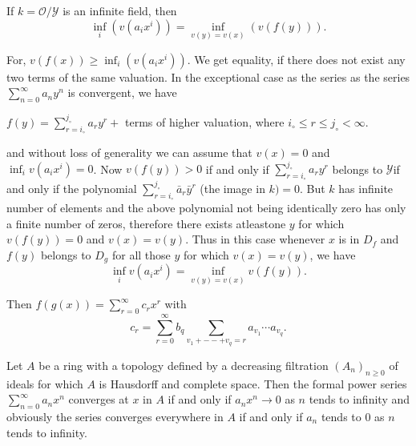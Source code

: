 \setcounter{remark}{0}
\begin{remark}
If $k=\mathscr{O}/ \mathscr{Y}$ is an infinite field, then
$$
\inf_i (v(a_i x^i))= \inf_{v(y) = v(x)} (v(f(y))).
$$
\end{remark}

For, $v(f(x))\geq \inf_i (v(a_i x^i))$. We get equality, if there does
not exist any two terms of the same valuation. In the exceptional case
as the series as the series $\sum\limits_{n=0}^{\infty} a_n y^n$ is
convergent, we have 

$f(y) = \sum\limits_{r=i_\circ}^{j_\circ}a_r y^r+$ terms of higher valuation,
where $i_\circ \leq r \leq j_\circ < \infty$.

and without loss of generality we can assume that $v(x)=0$ and $\inf_i
v(a_i x^i)=0$. Now $v(f(y))>0$ if and only if
$\sum\limits_{r=i_\circ}^{j_\circ} a_r y^r$ belongs to
$\mathscr{Y}$\iec  if and only if the polynomial
$\sum\limits_{r=i_\circ}^{j_\circ} \bar{a}_r \bar{y}^r$ (the image in
$k)=0$. But $k$ has infinite  number of elements and the above
polynomial not being identically zero has only a finite number of
zeros, therefore there exists  
atleast\pageoriginale one $y$ for which $v(f(y))=0$ and  $v(x) = v(y)$. Thus in this
case whenever $x$ is in $D_f$ and $f(y)$ belongs to $D_g$ for all
those $y$ for which $v(x) = v(y)$, we have 
$$
\inf_i v(a_i x^i)= \inf_{v(y) = v(x)} v(f(y)).
$$

Then $f(g(x)) = \sum\limits_{r=0}^{\infty} c_r x^r$ with
$$
c_r = \sum_{r=0}^{\infty} b_q \sum_{v_1 + --+v_q=r} a_{v_1}\cdots a_{v_q}.
$$

\begin{remark}%
  Let $A$ be a ring with a topology defined by a decreasing filtration
  $(A_n)_{n \geq 0}$ of ideals for which $A$ is Hausdorff and complete
  space. Then the formal power series $\sum\limits_{n=0}^{\infty} a_n
  x^n$ converges at $x$ in $A$ if and only if $a_n x^n \to 0$ as $n$
  tends to infinity and obviously the series converges everywhere in
  $A$ if and only if $a_n$ tends to $0$ as $n$ tends to infinity. 
\end{remark}
